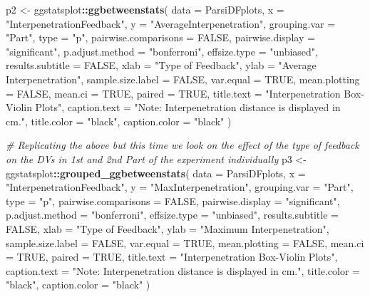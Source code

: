 \documentclass[
]{article}
\newenvironment{Shaded}{\begin{snugshade}}{\end{snugshade}}
\newcommand{\CommentTok}[1]{\textcolor[rgb]{0.56,0.35,0.01}{\textit{#1}}}
\newcommand{\DataTypeTok}[1]{\textcolor[rgb]{0.13,0.29,0.53}{#1}}
\newcommand{\KeywordTok}[1]{\textcolor[rgb]{0.13,0.29,0.53}{\textbf{#1}}}
\newcommand{\NormalTok}[1]{#1}
\newcommand{\OperatorTok}[1]{\textcolor[rgb]{0.81,0.36,0.00}{\textbf{#1}}}
\newcommand{\OtherTok}[1]{\textcolor[rgb]{0.56,0.35,0.01}{#1}}
\newcommand{\StringTok}[1]{\textcolor[rgb]{0.31,0.60,0.02}{#1}}
\begin{document}
\begin{Shaded}
\begin{Highlighting}[]
\NormalTok{p2 <-}\StringTok{ }\NormalTok{ggstatsplot}\OperatorTok{::}\KeywordTok{ggbetweenstats}\NormalTok{(}
  \DataTypeTok{data =}\NormalTok{ ParsiDFplots,}
  \DataTypeTok{x =} \StringTok{"InterpenetrationFeedback"}\NormalTok{,}
  \DataTypeTok{y =} \StringTok{"AverageInterpenetration"}\NormalTok{,}
  \DataTypeTok{grouping.var =} \StringTok{"Part"}\NormalTok{,}
  \DataTypeTok{type =} \StringTok{"p"}\NormalTok{,}
  \DataTypeTok{pairwise.comparisons =} \OtherTok{FALSE}\NormalTok{,}
  \DataTypeTok{pairwise.display =} \StringTok{"significant"}\NormalTok{,}
  \DataTypeTok{p.adjust.method =} \StringTok{"bonferroni"}\NormalTok{,}
  \DataTypeTok{effsize.type =} \StringTok{"unbiased"}\NormalTok{,}
  \DataTypeTok{results.subtitle =} \OtherTok{FALSE}\NormalTok{,}
  \DataTypeTok{xlab =} \StringTok{"Type of Feedback"}\NormalTok{,}
  \DataTypeTok{ylab =} \StringTok{"Average Interpenetration"}\NormalTok{,}
  \DataTypeTok{sample.size.label =} \OtherTok{FALSE}\NormalTok{,}
  \DataTypeTok{var.equal =} \OtherTok{TRUE}\NormalTok{,}
  \DataTypeTok{mean.plotting =} \OtherTok{FALSE}\NormalTok{,}
  \DataTypeTok{mean.ci =} \OtherTok{TRUE}\NormalTok{,}
  \DataTypeTok{paired =} \OtherTok{TRUE}\NormalTok{,}
  \DataTypeTok{title.text =} \StringTok{"Interpenetration Box-Violin Plots"}\NormalTok{,}
  \DataTypeTok{caption.text =} \StringTok{"Note: Interpenetration distance is displayed in cm."}\NormalTok{,}
  \DataTypeTok{title.color =} \StringTok{"black"}\NormalTok{,}
  \DataTypeTok{caption.color =} \StringTok{"black"}
\NormalTok{)}


\CommentTok{# Replicating the above but this time we look on the effect of the type of feedback on the DVs in 1st and 2nd Part of the experiment individually}
\NormalTok{p3 <-}\StringTok{ }\NormalTok{ggstatsplot}\OperatorTok{::}\KeywordTok{grouped_ggbetweenstats}\NormalTok{(}
  \DataTypeTok{data =}\NormalTok{ ParsiDFplots,}
  \DataTypeTok{x =} \StringTok{"InterpenetrationFeedback"}\NormalTok{,}
  \DataTypeTok{y =} \StringTok{"MaxInterpenetration"}\NormalTok{,}
  \DataTypeTok{grouping.var =} \StringTok{"Part"}\NormalTok{,}
  \DataTypeTok{type =} \StringTok{"p"}\NormalTok{,}
  \DataTypeTok{pairwise.comparisons =} \OtherTok{FALSE}\NormalTok{,}
  \DataTypeTok{pairwise.display =} \StringTok{"significant"}\NormalTok{,}
  \DataTypeTok{p.adjust.method =} \StringTok{"bonferroni"}\NormalTok{,}
  \DataTypeTok{effsize.type =} \StringTok{"unbiased"}\NormalTok{,}
  \DataTypeTok{results.subtitle =} \OtherTok{FALSE}\NormalTok{,}
  \DataTypeTok{xlab =} \StringTok{"Type of Feedback"}\NormalTok{,}
  \DataTypeTok{ylab =} \StringTok{"Maximum Interpenetration"}\NormalTok{,}
  \DataTypeTok{sample.size.label =} \OtherTok{FALSE}\NormalTok{,}
  \DataTypeTok{var.equal =} \OtherTok{TRUE}\NormalTok{,}
  \DataTypeTok{mean.plotting =} \OtherTok{FALSE}\NormalTok{,}
  \DataTypeTok{mean.ci =} \OtherTok{TRUE}\NormalTok{,}
  \DataTypeTok{paired =} \OtherTok{TRUE}\NormalTok{,}
  \DataTypeTok{title.text =} \StringTok{"Interpenetration Box-Violin Plots"}\NormalTok{,}
  \DataTypeTok{caption.text =} \StringTok{"Note: Interpenetration distance is displayed in cm."}\NormalTok{,}
  \DataTypeTok{title.color =} \StringTok{"black"}\NormalTok{,}
  \DataTypeTok{caption.color =} \StringTok{"black"}
\NormalTok{  ) }


\end{Highlighting}
\end{Shaded}
\end{document}
